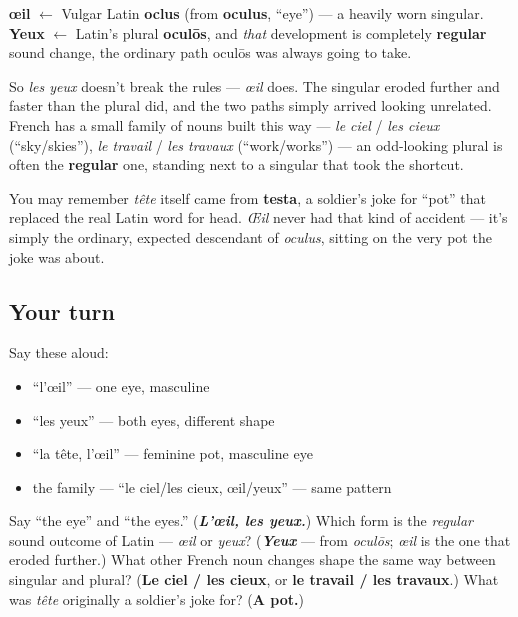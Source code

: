 \begin{cousinweb}
\textbf{œil} $\leftarrow$ Vulgar Latin \textbf{oclus} (from \textbf{oculus}, \textquotedblleft{}eye\textquotedblright{}) — a heavily worn singular. \textbf{Yeux} $\leftarrow$ Latin's plural \textbf{oculōs}, and \emph{that} development is completely \textbf{regular} sound change, the ordinary path oculōs was always going to take.

So \emph{les yeux} doesn't break the rules — \emph{œil} does. The singular eroded further and faster than the plural did, and the two paths simply arrived looking unrelated. French has a small family of nouns built this way — \emph{le ciel} / \emph{les cieux} (\textquotedblleft{}sky/skies\textquotedblright{}), \emph{le travail} / \emph{les travaux} (\textquotedblleft{}work/works\textquotedblright{}) — an odd-looking plural is often the \textbf{regular} one, standing next to a singular that took the shortcut.
\end{cousinweb}

\begin{culture}
You may remember \emph{tête} itself came from \textbf{testa}, a soldier's joke for \textquotedblleft{}pot\textquotedblright{} that replaced the real Latin word for head. \emph{Œil} never had that kind of accident — it's simply the ordinary, expected descendant of \emph{oculus}, sitting on the very pot the joke was about.
\end{culture}

\subsection*{Your turn}
Say these aloud:

\begin{itemize}
\raggedright
  \item \textquotedblleft{}l'œil\textquotedblright{} — one eye, masculine
  \item \textquotedblleft{}les yeux\textquotedblright{} — both eyes, different shape
  \item \textquotedblleft{}la tête, l'œil\textquotedblright{} — feminine pot, masculine eye
  \item the family — \textquotedblleft{}le ciel/les cieux, œil/yeux\textquotedblright{} — same pattern
\end{itemize}

\begin{tcolorbox}[breakable,colback=teal!4,colframe=teal!35!black,title={Before you move on}]
Say \textquotedblleft{}the eye\textquotedblright{} and \textquotedblleft{}the eyes.\textquotedblright{} (\emph{\textbf{L'œil, les yeux.}}) Which form is the \emph{regular} sound outcome of Latin — \emph{œil} or \emph{yeux}? (\emph{\textbf{Yeux}} — from \emph{oculōs}; \emph{œil} is the one that eroded further.) What other French noun changes shape the same way between singular and plural? (\textbf{Le ciel / les cieux}, or \textbf{le travail / les travaux}.) What was \emph{tête} originally a soldier's joke for? (\textbf{A pot.})
\end{tcolorbox}

